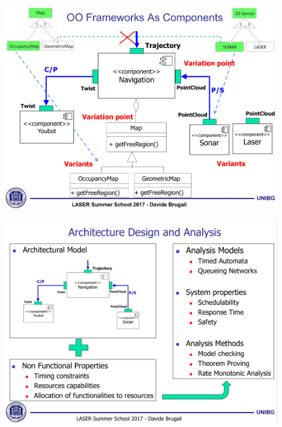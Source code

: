 \documentclass[xetex,mathserif,serif]{beamer}
\begin{document}
	\begin{frame}
		\begin{center}
			\includegraphics[width=0.9\textwidth]{brugali16.png}
		\end{center}
	\end{frame}

	\begin{frame}
		\begin{center}
			\includegraphics[width=0.9\textwidth]{brugali17.png}
		\end{center}
	\end{frame}
\end{document}

